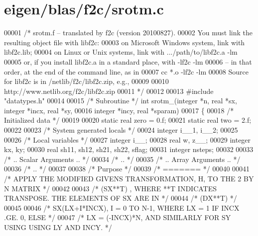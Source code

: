 \hypertarget{eigen_2blas_2f2c_2srotm_8c_source}{}\section{eigen/blas/f2c/srotm.c}
\label{eigen_2blas_2f2c_2srotm_8c_source}

\begin{DoxyCode}
00001 \textcolor{comment}{/* srotm.f -- translated by f2c (version 20100827).}
00002 \textcolor{comment}{   You must link the resulting object file with libf2c:}
00003 \textcolor{comment}{    on Microsoft Windows system, link with libf2c.lib;}
00004 \textcolor{comment}{    on Linux or Unix systems, link with .../path/to/libf2c.a -lm}
00005 \textcolor{comment}{    or, if you install libf2c.a in a standard place, with -lf2c -lm}
00006 \textcolor{comment}{    -- in that order, at the end of the command line, as in}
00007 \textcolor{comment}{        cc *.o -lf2c -lm}
00008 \textcolor{comment}{    Source for libf2c is in /netlib/f2c/libf2c.zip, e.g.,}
00009 \textcolor{comment}{}
00010 \textcolor{comment}{        http://www.netlib.org/f2c/libf2c.zip}
00011 \textcolor{comment}{*/}
00012 
00013 \textcolor{preprocessor}{#include "datatypes.h"}
00014 
00015 \textcolor{comment}{/* Subroutine */} \textcolor{keywordtype}{int} srotm\_(integer *n, real *sx, integer *incx, real *sy, 
00016     integer *incy, real *sparam)
00017 \{
00018     \textcolor{comment}{/* Initialized data */}
00019 
00020     \textcolor{keyword}{static} real zero = 0.f;
00021     \textcolor{keyword}{static} real two = 2.f;
00022 
00023     \textcolor{comment}{/* System generated locals */}
00024     integer i\_\_1, i\_\_2;
00025 
00026     \textcolor{comment}{/* Local variables */}
00027     integer i\_\_;
00028     real w, z\_\_;
00029     integer kx, ky;
00030     real sh11, sh12, sh21, sh22, sflag;
00031     integer nsteps;
00032 
00033 \textcolor{comment}{/*     .. Scalar Arguments .. */}
00034 \textcolor{comment}{/*     .. */}
00035 \textcolor{comment}{/*     .. Array Arguments .. */}
00036 \textcolor{comment}{/*     .. */}
00037 
00038 \textcolor{comment}{/*  Purpose */}
00039 \textcolor{comment}{/*  ======= */}
00040 
00041 \textcolor{comment}{/*     APPLY THE MODIFIED GIVENS TRANSFORMATION, H, TO THE 2 BY N MATRIX */}
00042 
00043 \textcolor{comment}{/*     (SX**T) , WHERE **T INDICATES TRANSPOSE. THE ELEMENTS OF SX ARE IN */}
00044 \textcolor{comment}{/*     (DX**T) */}
00045 
00046 \textcolor{comment}{/*     SX(LX+I*INCX), I = 0 TO N-1, WHERE LX = 1 IF INCX .GE. 0, ELSE */}
00047 \textcolor{comment}{/*     LX = (-INCX)*N, AND SIMILARLY FOR SY USING USING LY AND INCY. */}

\end{DoxyCode}
